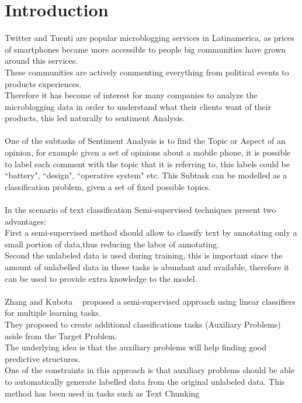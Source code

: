 \documentclass[4pt,a4paper,twocolumn]{article}
\begin{document}
\section{Introduction}
Twitter and Tuenti are popular microblogging services in Latinamerica,
as prices of smartphones became more accessible to people big communities
have grown around this services.\\
These communities are actively commenting everything from political events to products experiences.\\
Therefore it has become of interest for many companies to analyze the microblogging data in order to understand
what their clients want of their products, this led naturally to sentiment Analysis.\\
\\
One of the subtasks of Sentiment Analysis is to find the Topic or Aspect of an opinion,
for example given a set of opinions about a mobile phone, it is possible to label each comment
with the topic that it is referring to, this labels could be ``battery", ``design", ``operative system" etc.
This Subtask can be modelled as a classification problem, given a set of fixed possible topics.\\
\\
In the scenario of text classification Semi-supervised techniques present two advantages:\\
First a semi-supervised method should allow to classify text by annotating only a small portion of data,thus reducing the labor of annotating.\\
Second the unlabeled data is used during training, this is important since the amount of unlabelled data in these tasks is abundant and available, therefore it can be used to provide extra knowledge to the model.\\
\\
Zhang and Kubota ~\cite{Ando:2005:FLP:1046920.1194905} proposed a semi-supervised approach using linear classifiers for multiple learning tasks.\\
They proposed to create additional classifications tasks (Auxiliary Problems) aside from the Target Problem.\\
The underlying idea is that the auxiliary problems will help finding good predictive structures.\\
One of the constraints in this approach is that auxiliary problems should be  able to automatically generate labelled data from the original unlabeled data.
This method has been used in tasks such as Text Chunking ~\cite{Ando:2005:HSL:1219840.1219841}\\
\end{document}
